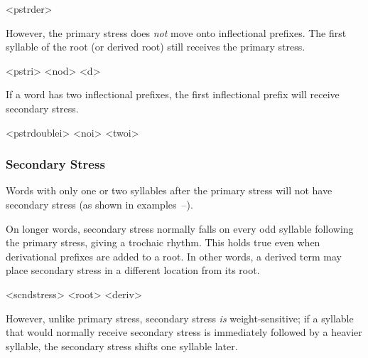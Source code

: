 \ex<pstrder>
	   
\xe

However, the primary stress does \emph{not} move onto inflectional prefixes. The first syllable of the root (or derived root) still receives the primary stress.

\pex<pstri>
	\a<nod>    
	    
\xe

If a word has two inflectional prefixes, the first inflectional prefix will receive secondary stress.

\pex<pstrdoublei>
	\a<noi>    
	\a<onei1>    
	\a<onei2>    
	\a<twoi>    
\xe

\subsubsection{Secondary Stress}
\label{sec:secondary-stress}

Words with only one or two syllables after the primary stress will not have secondary stress (as shown in examples~--).

On longer words, secondary stress normally falls on every odd syllable following the primary stress, giving \lang{} a trochaic rhythm.\autocite{wals-17} This holds true even when derivational prefixes are added to a root. In other words, a derived term may place secondary stress in a different location from its root.

\pex<scndstress>
	\a<root>    
	\a<deriv>    
\xe

However, unlike primary stress, secondary stress \emph{is} weight-sensitive;\autocite{wals-16} if a syllable that would normally receive secondary stress is immediately followed by a heavier syllable, the secondary stress shifts one syllable later.

